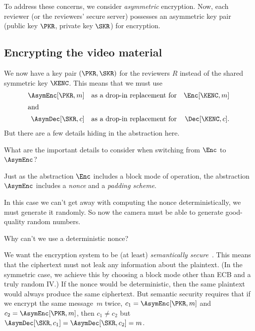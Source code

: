 To address these concerns, we consider \emph{asymmetric} encryption.
Now, each reviewer (or the reviewers' secure server) possesses an asymmetric 
key pair (public key \(\PKR\), private key \(\SKR\)) for encryption.

\subsection{Encrypting the video material}

We now have a key pair \((\PKR, \SKR)\) for the reviewers \(R\) instead of the  
shared symmetric key \(\KENC\).
This means that we must use
\begin{align*}
  \AsymEnc[\PKR, m] && \text{as a drop-in replacement for}
                    && \Enc[\KENC, m] \\
  \intertext{and}
  \AsymDec[\SKR, c] && \text{as a drop-in replacement for}
                    && \Dec[\KENC, c].
\end{align*}
But there are a few details hiding in the abstraction here.

\begin{exercise}
  What are the important details to consider when switching from \(\Enc\) to 
  \(\AsymEnc\)?
\end{exercise}

Just as the abstraction \(\Enc\) includes a block mode of operation,
the abstraction \(\AsymEnc\) includes a \emph{nonce} and a \emph{padding 
scheme}.

In this case we can't get away with computing the nonce deterministically, we 
must generate it randomly.
So now the camera must be able to generate good-quality random numbers.

\begin{exercise}
  Why can't we use a deterministic nonce?
\end{exercise}

\begin{solution}
  We want the encryption system to be (at least) \emph{semantically
  secure}~\autocite{GoldwasserMicali1984}.
  This means that the ciphertext must not leak any information about the 
  plaintext.
  (In the symmetric case, we achieve this by choosing a block mode other than 
  ECB and a truly random IV.)
  If the nonce would be deterministic, then the same plaintext would always 
  produce the same ciphertext.
  But semantic security requires that if we encrypt the same message~\(m\) 
  twice, \ie \(c_1 = \AsymEnc[\PKR, m]\)
  and \(c_2 = \AsymEnc[\PKR, m]\), then
  \(c_1 \neq c_2\) but \(\AsymDec[\SKR, c_1] = \AsymDec[\SKR, c_2] = m\).
\end{solution}

